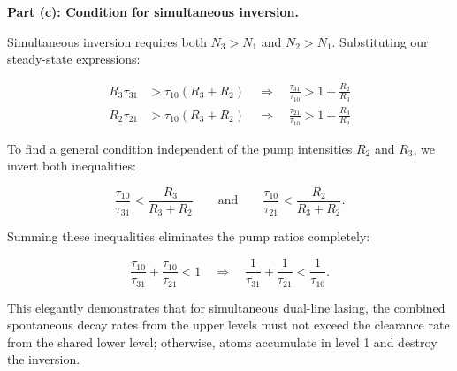 \textbf{Part (c): Condition for simultaneous inversion.}

Simultaneous inversion requires both $N_3 > N_1$ and $N_2 > N_1$. Substituting our steady-state expressions:

\begin{align*}
  R_3 \tau_{31} &> \tau_{10}(R_3 + R_2) \quad\Longrightarrow\quad \frac{\tau_{31}}{\tau_{10}} > 1 + \frac{R_2}{R_3} \\[1ex]
  R_2 \tau_{21} &> \tau_{10}(R_3 + R_2) \quad\Longrightarrow\quad \frac{\tau_{21}}{\tau_{10}} > 1 + \frac{R_3}{R_2}
\end{align*}

To find a general condition independent of the pump intensities $R_2$ and $R_3$, we invert both inequalities:

\begin{equation*}
  \frac{\tau_{10}}{\tau_{31}} < \frac{R_3}{R_3 + R_2} \qquad\text{and}\qquad \frac{\tau_{10}}{\tau_{21}} < \frac{R_2}{R_3 + R_2}.
\end{equation*}

Summing these inequalities eliminates the pump ratios completely:

\begin{equation*}
  \frac{\tau_{10}}{\tau_{31}} + \frac{\tau_{10}}{\tau_{21}} < 1 \quad\Longrightarrow\quad
  \boxed{\frac{1}{\tau_{31}} + \frac{1}{\tau_{21}} < \frac{1}{\tau_{10}}.}
\end{equation*}

This elegantly demonstrates that for simultaneous dual-line lasing, the combined spontaneous decay rates from the upper levels must not exceed the clearance rate from the shared lower level; otherwise, atoms accumulate in level 1 and destroy the inversion.


